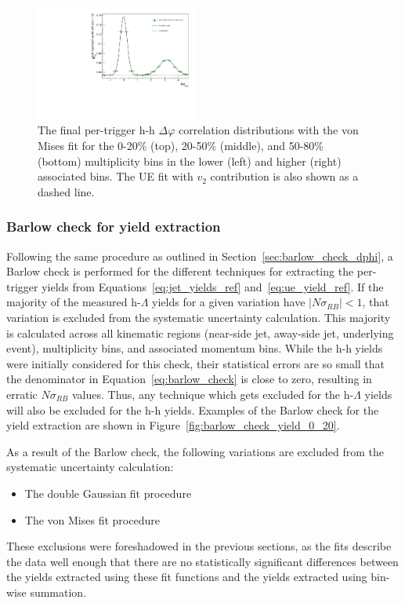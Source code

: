 \begin{figure}[ht]
    \includegraphics[width=0.48\textwidth]{figures/analysis/h_h_dphi_von_50_80_highpt.pdf}
    \caption{The final per-trigger h-h $\Delta\varphi$ correlation distributions with the von Mises fit for the 0-20\% (top), 20-50\% (middle), and 50-80\% (bottom) multiplicity bins in the lower (left) and higher (right) associated \pt bins. The UE fit with $v_{2}$ contribution is also shown as a dashed line.}
    \label{fig:von_fits_h}
\end{figure}

\subsubsection{Barlow check for yield extraction}
\label{sec:barlow_check_yield}

Following the same procedure as outlined in Section~\ref{sec:barlow_check_dphi}, a Barlow check is performed for the different techniques for extracting the per-trigger yields from Equations~\ref{eq:jet_yields_ref} and~\ref{eq:ue_yield_ref}. If the majority of the measured h-$\Lambda$ yields for a given variation have $|N\sigma_{RB}| < 1$, that variation is excluded from the systematic uncertainty calculation. This majority is calculated across all kinematic regions (near-side jet, away-side jet, underlying event), multiplicity bins, and associated momentum bins. While the h-h yields were initially considered for this check, their statistical errors are so small that the denominator in Equation~\ref{eq:barlow_check} is close to zero, resulting in erratic $N\sigma_{RB}$ values. Thus, any technique which gets excluded for the h-$\Lambda$ yields will also be excluded for the h-h yields. Examples of the Barlow check for the yield extraction are shown in Figure~\ref{fig:barlow_check_yield_0_20}. 

As a result of the Barlow check, the following variations are excluded from the systematic uncertainty calculation:
%
\begin{itemize}
    \item The double Gaussian fit procedure
    \item The von Mises fit procedure
\end{itemize}
%
These exclusions were foreshadowed in the previous sections, as the fits describe the data well enough that there are no statistically significant differences between the yields extracted using these fit functions and the yields extracted using bin-wise summation.

